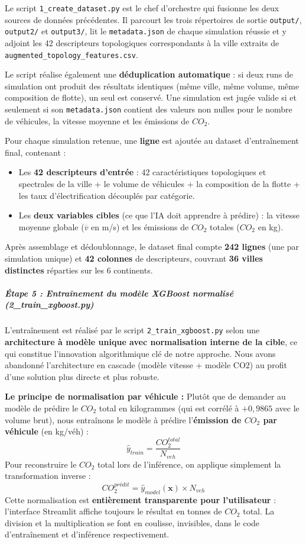 \documentclass[10pt, a4paper]{article}
\providecommand{\tightlist}{}
\begin{document}
Le script \texttt{1\_create\_dataset.py} est le chef d'orchestre qui
fusionne les deux sources de données précédentes. Il parcourt les trois
répertoires de sortie \texttt{output/}, \texttt{output2/} et
\texttt{output3/}, lit le \texttt{metadata.json} de chaque simulation
réussie et y adjoint les 42 descripteurs topologiques correspondants à
la ville extraits de \texttt{augmented\_topology\_features.csv}.

Le script réalise également une \textbf{déduplication automatique} : si
deux runs de simulation ont produit des résultats identiques (même
ville, même volume, même composition de flotte), un seul est conservé.
Une simulation est jugée valide si et seulement si son
\texttt{metadata.json} contient des valeurs non nulles pour le nombre de
véhicules, la vitesse moyenne et les émissions de \(CO_2\).

Pour chaque simulation retenue, une \textbf{ligne} est ajoutée au
dataset d'entraînement final, contenant :

\begin{itemize}
\tightlist
\item
  Les \textbf{42 descripteurs d'entrée} : 42 caractéristiques
  topologiques et spectrales de la ville + le volume de véhicules + la
  composition de la flotte + les taux d'électrification découplés par
  catégorie.
\item
  Les \textbf{deux variables cibles} (ce que l'IA doit apprendre à
  prédire) : la vitesse moyenne globale (\(\overline{v}\) en m/s) et les
  émissions de \(CO_2\) totales (\(CO_2\) en kg).
\end{itemize}

Après assemblage et dédoublonnage, le dataset final compte \textbf{242
lignes} (une par simulation unique) et \textbf{42 colonnes} de
descripteurs, couvrant \textbf{36 villes distinctes} réparties sur les 6
continents.

\subparagraph{Étape 5 : Entraînement du modèle XGBoost normalisé
(2\_train\_xgboost.py)}\label{uxe9tape-5-entrauxeenement-du-moduxe8le-xgboost-normalisuxe9-2_train_xgboost.py}

L'entraînement est réalisé par le script \texttt{2\_train\_xgboost.py}
selon une \textbf{architecture à modèle unique avec normalisation
interne de la cible}, ce qui constitue l'innovation algorithmique clé de
notre approche. Nous avons abandonné l'architecture en cascade (modèle
vitesse + modèle CO2) au profit d'une solution plus directe et plus
robuste.

\textbf{Le principe de normalisation par véhicule :} Plutôt que de
demander au modèle de prédire le \(CO_2\) total en kilogrammes (qui est
corrélé à \(+0,9865\) avec le volume brut), nous entraînons le modèle à
prédire l'\textbf{émission de \(CO_2\) par véhicule} (en kg/véh) :
\[\hat{y}_{train} = \frac{CO_2^{total}}{N_{veh}}\] Pour reconstruire le
\(CO_2\) total lors de l'inférence, on applique simplement la
transformation inverse :
\[CO_2^{prédit} = \hat{y}_{model}(\mathbf{x}) \times N_{veh}\] Cette
normalisation est \textbf{entièrement transparente pour l'utilisateur} :
l'interface Streamlit affiche toujours le résultat en tonnes de \(CO_2\)
total. La division et la multiplication se font en coulisse, invisibles,
dans le code d'entraînement et d'inférence respectivement.
\end{document}
